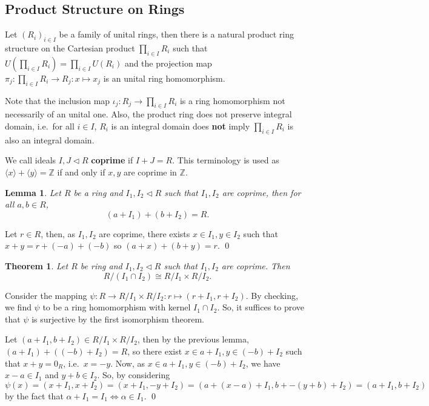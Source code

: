 \documentclass[
]{article}
\newtheorem{theorem}{Theorem}
\newtheorem{lemma}{Lemma}
\begin{document}
\hypertarget{product-structure-on-rings}{%
\subsection{Product Structure on
Rings}\label{product-structure-on-rings}}

Let \((R_i)_{i \in I}\) be a family of unital rings, then there is a
natural product ring structure on the Cartesian product
\(\prod_{i \in I} R_i\) such that
\(U \left(\prod_{i \in I} R_i \right) = \prod_{i \in I} U(R_i)\) and the
projection map \(\pi_j : \prod_{i \in I} R_i \to R_j : x \mapsto x_j\)
is an unital ring homomorphism.

Note that the inclusion map \(\iota_j : R_j \to \prod_{i \in I} R_i\) is
a ring homomorphism not necessarily of an unital one. Also, the product
ring does not preserve integral domain, i.e.~for all \(i \in I\),
\(R_i\) is an integral domain does \textbf{not} imply
\(\prod_{i \in I} R_i\) is also an integral domain.

We call ideals \(I, J \triangleleft R\) \textbf{coprime} if
\(I + J = R\). This terminology is used as
\(\langle x \rangle + \langle y \rangle = \mathbb{Z}\) if and only if
\(x, y\) are coprime in \(\mathbb{Z}\).

\begin{lemma}
  Let \(R\) be a ring and \(I_1, I_2 \triangleleft R\) such that \(I_1, I_2\) 
  are coprime, then for all \(a, b \in R\), 
  \[(a + I_1) + (b + I_2) = R.\]
\end{lemma}
\proof

Let \(r \in R\), then, as \(I_1, I_2\) are coprime, there exists
\(x \in I_1, y \in I_2\) such that \(x + y = r + (-a) + (-b)\) so
\((a + x) + (b + y) = r\). \qed

\begin{theorem}
  Let \(R\) be ring and \(I_1, I_2 \triangleleft R\) such 
  that \(I_1, I_2\) are coprime. Then 
  \[
    R / (I_1 \cap I_2) \cong R / I_1 \times R / I_2. 
  \]
\end{theorem}
\proof

Consider the mapping
\(\psi : R \to R / I_1 \times R / I_2 : r \mapsto (r + I_1, r + I_2)\).
By checking, we find \(\psi\) to be a ring homomorphism with kernel
\(I_1 \cap I_2\). So, it suffices to prove that \(\psi\) is surjective
by the first isomorphism theorem.

Let \((a + I_1, b + I_2) \in R / I_1 \times R / I_2\), then by the
previous lemma, \((a + I_1) + ((-b) + I_2) = R\), so there exist
\(x \in a + I_1, y \in (-b) + I_2\) such that \(x + y = 0_R\),
i.e.~\(x = -y\). Now, as \(x \in a + I_1, y \in (-b) + I_2\), we have
\(x - a \in I_1\) and \(y + b \in I_2\). So, by considering
\(\psi(x) = (x + I_1, x + I_2) = (x + I_1, -y + I_2) =  (a + (x - a) + I_1, b + -(y + b) + I_2) = (a + I_1, b + I_2)\)
by the fact that \(\alpha + I_1 = I_1 \iff \alpha \in I_1\). \qed
\end{document}
